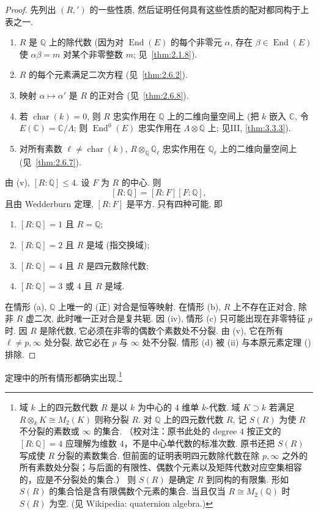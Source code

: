\begin{proof}
先列出 $(R, {}')$ 的一些性质, 然后证明任何具有这些性质的配对都同构于上表之一.
\begin{enumerate}[label=\textup{(\roman*)}]
\item $R$ 是 $\mathbb{Q}$ 上的除代数 (因为对 $\operatorname{End}(E)$ 的每个非零元 $\alpha$, 存在 $\beta\in\operatorname{End}(E)$ 使 $\alpha\beta = m$ 对某个非零整数 $m$; 见~\ref{thm:2.1.8}).
\item $R$ 的每个元素满足二次方程 (见~\ref{thm:2.6.2}).
\item 映射 $\alpha\mapsto\alpha'$ 是 $R$ 的正对合 (见~\ref{thm:2.6.8}).
\item 若 $\operatorname{char}(k) = 0$, 则 $R$ 忠实作用在 $\mathbb{Q}$ 上的二维向量空间上 (把 $k$ 嵌入 $\mathbb{C}$, 令 $E(\mathbb{C}) = \mathbb{C}/\Lambda$; 则 $\operatorname{End}^0(E)$ 忠实作用在 $\Lambda\otimes\mathbb{Q}$ 上; 见III, \ref{thm:3.3.3}).
\item 对所有素数 $\ell\neq\operatorname{char}(k)$, $R\otimes_{\mathbb{Q}}\mathbb{Q}_\ell$ 忠实作用在 $\mathbb{Q}_\ell$ 上的二维向量空间上 (见~\ref{thm:2.6.7}).
\end{enumerate}
由 (v), $[R:\mathbb{Q}]\le 4$. 设 $F$ 为 $R$ 的中心. 则
\[
[R:\mathbb{Q}] = [R:F][F:\mathbb{Q}],
\]
且由 Wedderburn 定理, $[R:F]$ 是平方. 只有四种可能, 即
\begin{enumerate}[label=\textup{(\alph*)}]
\item $[R:\mathbb{Q}] = 1$ 且 $R = \mathbb{Q}$;
\item $[R:\mathbb{Q}] = 2$ 且 $R$ 是域 (指交换域);
\item $[R:\mathbb{Q}] = 4$ 且 $R$ 是四元数除代数;
\item $[R:\mathbb{Q}] = 3$ 或 $4$ 且 $R$ 是域.
\end{enumerate}
在情形 (a), $\mathbb{Q}$ 上唯一的 (正) 对合是恒等映射. 在情形 (b), $R$ 上不存在正对合, 除非 $R$ 虚二次, 此时唯一正对合是复共轭. 因 (iv), 情形 (c) 只可能出现在非零特征 $p$ 时. 因 $R$ 是除代数, 它必须在非零的偶数个素数处不分裂. 由 (v), 它在所有 $\ell\neq p,\infty$ 处分裂, 故它必在 $p$ 与 $\infty$ 处不分裂. 情形 (d) 被 (ii) 与本原元素定理 (\cite[5.1]{milne-ft}) 排除.
\end{proof}

定理中的所有情形都确实出现.\footnote{域 $k$ 上的四元数代数 $R$ 是以 $k$ 为中心的 $4$ 维单 $k$-代数. 域 $K\supset k$ 若满足 $R\otimes_k K\cong M_2(K)$ 则称分裂 $R$. 对 $\mathbb{Q}$ 上的四元数代数 $R$, 记 $S(R)$ 为使 $R$ 不分裂的素数或 $\infty$ 的集合. （校对注：原书此处的 degree $4$ 按正文的 $[R:\mathbb{Q}]=4$ 应理解为维数 $4$，不是中心单代数的标准次数. 原书还把 $S(R)$ 写成使 $R$ 分裂的素数集合. 但前面的证明表明四元数除代数在除 $p,\infty$ 之外的所有素数处分裂；与后面的有限性、偶数个元素以及矩阵代数对应空集相容的，应是不分裂处的集合.） 则 $S(R)$ 是确定 $R$ 到同构的有限集. 形如 $S(R)$ 的集合恰是含有限偶数个元素的集合. 当且仅当 $R\cong M_2(\mathbb{Q})$ 时 $S(R)$ 为空. (见 Wikipedia: quaternion algebra.)}

